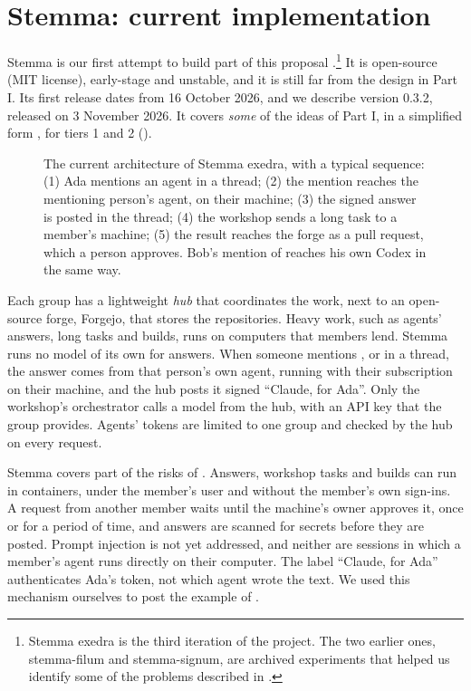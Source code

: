 \documentclass{article}
\begin{document}

\section{Stemma: current implementation}\label{sec-stemma}

Stemma is our first attempt to build part of this proposal \cite{stemmarepo}.\footnote{Stemma exedra is the third iteration of the project. The two earlier ones, stemma-filum and stemma-signum, are archived experiments that helped us identify some of the problems described in .} It is open-source (MIT license), early-stage and unstable, and it is still far from the design in Part I. Its first release dates from 16 October 2026, and we describe version 0.3.2, released on 3 November 2026. It covers \emph{some} of the ideas of Part I, in a simplified form \cite{stemmadocs}, for tiers 1 and 2 ().

\begin{figure}[t]
\centering
%
\caption{The current architecture of Stemma exedra, with a typical sequence: (1) Ada mentions an agent in a thread; (2) the mention reaches the mentioning person's agent, on their machine; (3) the signed answer is posted in the thread; (4) the workshop sends a long task to a member's machine; (5) the result reaches the forge as a pull request, which a person approves. Bob's mention of  reaches his own Codex in the same way.}\label{fig-stemma}
\end{figure}

Each group has a lightweight \emph{hub} that coordinates the work, next to an open-source forge, Forgejo, that stores the repositories. Heavy work, such as agents' answers, long tasks and builds, runs on computers that members lend. Stemma runs no model of its own for answers. When someone mentions ,  or  in a thread, the answer comes from that person's own agent, running with their subscription on their machine, and the hub posts it signed ``Claude, for Ada''. Only the workshop's orchestrator calls a model from the hub, with an API key that the group provides. Agents' tokens are limited to one group and checked by the hub on every request.

Stemma covers part of the risks of . Answers, workshop tasks and builds can run in containers, under the member's user and without the member's own sign-ins. A request from another member waits until the machine's owner approves it, once or for a period of time, and answers are scanned for secrets before they are posted. Prompt injection is not yet addressed, and neither are sessions in which a member's agent runs directly on their computer. The label ``Claude, for Ada'' authenticates Ada's token, not which agent wrote the text. We used this mechanism ourselves to post the example of .
\end{document}
